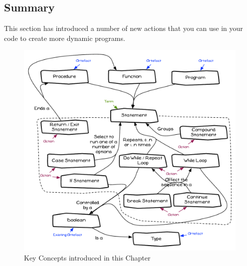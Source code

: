 



















\clearpage
\subsection{Summary} %
\label{sub:control_flow_summary}

This section has introduced a number of new actions that you can use in your code to create more dynamic programs. 

\begin{figure}[h]
   \centering
   \includegraphics[width=\textwidth]{./topics/control-flow/diagrams/Summary} 
   \caption[Chapter Concepts]{Key Concepts introduced in this Chapter}
   \label{fig:control-flow-summary}
\end{figure}

